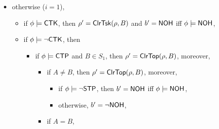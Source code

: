 {\begin{itemize}
\begin{itemize}
\begin{itemize}
\begin{itemize}
\begin{itemize}
\begin{itemize}
\begin{itemize}
\begin{itemize}
\begin{itemize}
										\item if $b = \neg \nohflag$, then $\rho'=\mvtsktop(\rho, i)$,
										\item otherwise, $\rho' = \rmact(\mvtsktop(\rho, i), 2, 1)$, 
									\end{itemize}
									\item otherwise, $b' = \nohflag$ iff $\phi \models \nohflag$, moreover, 
									\begin{itemize}
										\item if $b = \neg \nohflag$, then $\rho'=\push(\mvtsktop(\rho, i), B)$,
										\item otherwise, $\rho' = \rmact(\push(\mvtsktop(\rho, i), B), 2, 1)$, 
									\end{itemize}
								\end{itemize}
							\end{itemize}
						\end{itemize}
					\end{itemize}
			\end{itemize}
		\item otherwise ($i  = 1$),  
		\begin{itemize}
			\item if $\phi \models {\sf CTK}$, then $\rho' = \mathsf{ClrTsk}(\rho,B)$ and $b' = \nohflag$ iff $\phi \models \nohflag$, 
			\item if $\phi \models \neg {\sf CTK}$, then
			\begin{itemize}
				\item if $\phi \models {\sf CTP}$ and $B \in S_1$, then $\rho'=\mathsf{ClrTop}(\rho, B)$, moreover, 
				\begin{itemize}
            				\item if $A \neq B$, then $\rho'=\mathsf{ClrTop}(\rho, B)$, moreover, 
					\begin{itemize}
						\item if $\phi\models \neg {\sf STP}$, then $b' = \nohflag$ iff $\phi \models \nohflag$, 
						\item otherwise, $b' = \neg {\sf NOH}$, 
					\end{itemize}
					\item if $A = B$, 

\end{itemize}
\end{itemize}
\end{itemize}
\end{itemize}
\end{itemize}
\end{itemize}}
